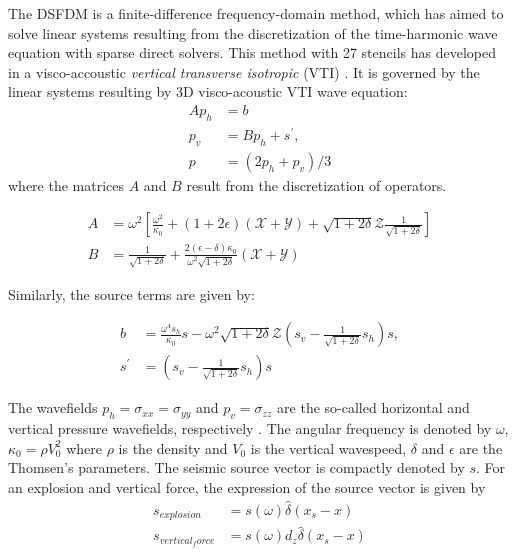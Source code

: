 The DSFDM is a finite-difference frequency-domain method, which has aimed to solve linear systems resulting from the discretization of the time-harmonic wave equation with sparse direct solvers. This method with 27 stencils has developed in a visco-accoustic \textit{vertical transverse isotropic} (VTI) \cite{Operto2007, Operto2015, Amestoy2016, Brossier2010, Brossier2014}. It is governed by the linear systems resulting by 3D visco-acoustic VTI wave equation:
\begin{align}
Ap_h &= b   \label{eq1}\\
p_v &= Bp_h + s^{'}, \label{eq2}\\
p &= (2p_h + p_v)/3 \label{eq3}
\end{align}
where the matrices $ A $ and $ B $ result from the discretization of operators.

\begin{align}
A &= \omega^{2} \left[ \frac{\omega^{2}}{\kappa_{0}} + (1+2 \epsilon) (\mathcal{X} + \mathcal{Y}) + \sqrt{1+2\delta} \mathcal{Z} \frac{1}{\sqrt{1+2\delta}} \right] \label{eq4}\\
B &= \frac{1}{\sqrt{1+2\delta}} + \frac{2(\epsilon - \delta)\kappa_{0}}{\omega^{2}\sqrt{1+2\delta}} (\mathcal{X} + \mathcal{Y}) 
\end{align}

Similarly, the source terms are given by:

\begin{align}
b &= \frac{\omega^{4}s_{h}}{\kappa_{0}} s - \omega^{2}\sqrt{1+2\delta} \mathcal{Z} \left(s_{v} - \frac{1}{\sqrt{1+2\delta}}s_{h} \right)s, \label{eqb}\\
s^{'} &=  \left(s_{v} - \frac{1}{\sqrt{1+2\delta}}s_{h} \right)s
\end{align}

The wavefields $ p_h = \sigma_{xx} = \sigma_{yy} $ and $ p_v = \sigma_{zz} $ are the so-called horizontal and vertical pressure wavefields, respectively \cite{Plessix2011}. The angular frequency is denoted by $ \omega$, $ \kappa_{0} = \rho V_{0}^{2} $  where $ \rho $ is the density and $ V_0 $ is the vertical wavespeed, $ \delta $ and $ \epsilon $ are the Thomsen's parameters. The seismic source vector is compactly denoted by $ s $. For an explosion and vertical force, the expression of the source vector is given by 
\begin{align}
s_{explosion} &= s(\omega) \hat{\delta}(x_s - x) \\
s_{vertical_force} &= s(\omega)d_z \hat{\delta}(x_s - x) 
\end{align}


